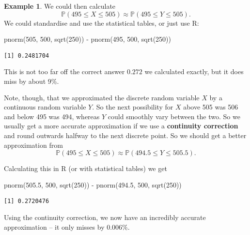 \documentclass[
  a4paper,
]{book}
\newenvironment{Shaded}{\begin{snugshade}}{\end{snugshade}}
\newcommand{\DecValTok}[1]{\textcolor[rgb]{0.00,0.00,0.81}{#1}}
\newcommand{\FloatTok}[1]{\textcolor[rgb]{0.00,0.00,0.81}{#1}}
\newcommand{\FunctionTok}[1]{\textcolor[rgb]{0.00,0.00,0.00}{#1}}
\newcommand{\NormalTok}[1]{#1}
\newcommand{\SpecialCharTok}[1]{\textcolor[rgb]{0.00,0.00,0.00}{#1}}
\theoremstyle{definition}
\theoremstyle{definition}
\newtheorem{example}{Example}[chapter]
\theoremstyle{definition}
\theoremstyle{definition}
\theoremstyle{remark}
\begin{document}
\begin{example}
We could then calculate
\[ \mathbb P(495 \leq X \leq 505) \approx \mathbb P(495 \leq Y \leq 505) . \]
We could standardise and use the statistical tables, or just use R:

\begin{Shaded}
\begin{Highlighting}[]
\FunctionTok{pnorm}\NormalTok{(}\DecValTok{505}\NormalTok{, }\DecValTok{500}\NormalTok{, }\FunctionTok{sqrt}\NormalTok{(}\DecValTok{250}\NormalTok{)) }\SpecialCharTok{{-}} \FunctionTok{pnorm}\NormalTok{(}\DecValTok{495}\NormalTok{, }\DecValTok{500}\NormalTok{, }\FunctionTok{sqrt}\NormalTok{(}\DecValTok{250}\NormalTok{))}
\end{Highlighting}
\end{Shaded}

\begin{verbatim}
[1] 0.2481704
\end{verbatim}

This is not too far off the correct answer \(0.272\) we calculated exactly, but it does miss by about 9\%.

Note, though, that we approximated the discrete random variable \(X\) by a continuous random variable \(Y\). So the next possibility for \(X\) above 505 was 506 and below 495 was 494, whereas \(Y\) could smoothly vary between the two. So we usually get a more accurate approximation if we use a \textbf{continuity correction} and round outwards halfway to the next discrete point. So we should get a better approximation from
\[ \mathbb P(495 \leq X \leq 505) \approx \mathbb P(494.5 \leq Y \leq 505.5) . \]

Calculating this in R (or with statistical tables) we get

\begin{Shaded}
\begin{Highlighting}[]
\FunctionTok{pnorm}\NormalTok{(}\FloatTok{505.5}\NormalTok{, }\DecValTok{500}\NormalTok{, }\FunctionTok{sqrt}\NormalTok{(}\DecValTok{250}\NormalTok{)) }\SpecialCharTok{{-}} \FunctionTok{pnorm}\NormalTok{(}\FloatTok{494.5}\NormalTok{, }\DecValTok{500}\NormalTok{, }\FunctionTok{sqrt}\NormalTok{(}\DecValTok{250}\NormalTok{))}
\end{Highlighting}
\end{Shaded}

\begin{verbatim}
[1] 0.2720476
\end{verbatim}

Using the continuity correction, we now have an incredibly accurate approximation -- it only misses by 0.006\%.
\end{example}
\end{document}
